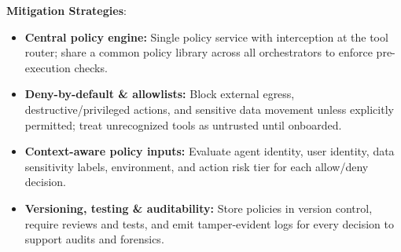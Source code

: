 \begin{TNtwocol}
    \textbf{Mitigation Strategies}:
    \begin{itemize}
        \item \textbf{Central policy engine:} Single policy service with interception at the tool router; share a common policy library across all orchestrators to enforce pre-execution checks.
        \item \textbf{Deny-by-default \& allowlists:} Block external egress, destructive/privileged actions, and sensitive data movement unless explicitly permitted; treat unrecognized tools as untrusted until onboarded.
        \item \textbf{Context-aware policy inputs:} Evaluate agent identity, user identity, data sensitivity labels, environment, and action risk tier for each allow/deny decision.
        \item \textbf{Versioning, testing \& auditability:} Store policies in version control, require reviews and tests, and emit tamper-evident logs for every decision to support audits and forensics.
    \end{itemize}

\end{TNtwocol}